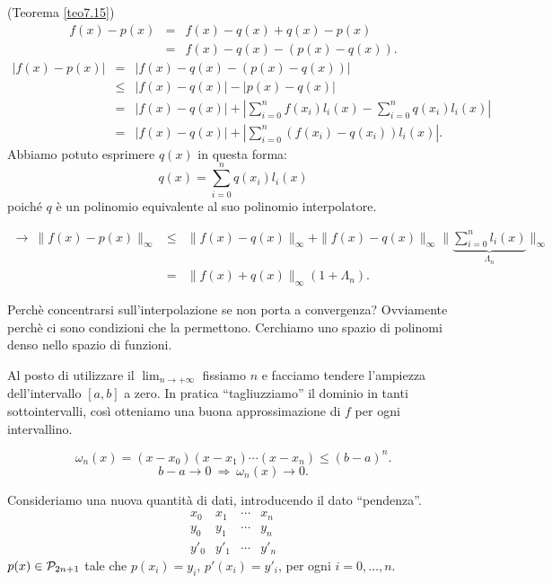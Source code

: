 \begin{dimo} (Teorema \ref{teo7.15})
\[
\begin{array}{lcl}
f(x) - p(x) & = & f(x) - q(x) + q(x) - p(x) \\
& = & f(x) - q(x) - (p(x) - q(x)).
\end{array}
\]
\[
\begin{array}{lcl}
|f(x) - p(x)| & = & |f(x) - q(x) -(p(x) - q(x))| \\
& \leq & |f(x) - q(x)| - |p(x) - q(x)| \\
& = & |f(x) - q(x)| + \left| \sum_{i = 0}^nf(x_i) l_i(x)
-\sum_{i=0}^nq(x_i)l_i(x)\right| \\
& = & | f(x) -q(x)| + \left| \sum_{i=0}^n (f(x_i)-q(x_i))l_i(x)\right|.
\end{array}
\]
Abbiamo potuto esprimere $q(x)$ in questa forma:
\[q(x) = \sum_{i=0}^nq(x_i)l_i(x)\]
poiché $q$ è un polinomio equivalente al suo polinomio
interpolatore.

\[
\begin{array}{lcl}
\longrightarrow \
\|f(x) - p(x)\|_{\infty} & \leq & \|f(x) - q(x)\|_\infty + \|f(x)- q(x)\|_{\infty}
\|\underbrace{\sum_{i=0}^n l_i(x)}_{\Lambda_n}\|_{\infty}\\
& = & \|f(x) + q(x)\|_\infty(1 + \Lambda_n).
\end{array}
\]
\end{dimo}


Perchè concentrarsi sull'interpolazione se non porta a convergenza? Ovviamente
perchè ci sono condizioni che la permettono. Cerchiamo uno spazio
di polinomi denso nello spazio di funzioni.

Al posto di utilizzare il $\lim_{n \to + \infty}$ fissiamo $n$ e facciamo tendere
l'ampiezza dell'intervallo $[a,b]$ a zero. In pratica ``tagliuzziamo'' il
dominio in tanti sottointervalli, così otteniamo una buona approssimazione
di $f$ per ogni intervallino.

\[\omega_n(x) = (x-x_0)(x-x_1)\cdots (x-x_n) \leq (b-a)^n.\]
\[b-a \longrightarrow 0 \ \Longrightarrow \ \omega_n(x) \longrightarrow 0.\]

Consideriamo una nuova quantità di dati, introducendo il dato ``pendenza''.
\[\begin{array}{ccccc}
x_0 & x_1 & \cdots & x_n   \\
y_0 & y_1 & \cdots & y_n  \\
y'_0 & y'_1 & \cdots & y'_n
\end{array}\]
$p(x) \in \mathcal{P}_{2n +1}$ tale che $p(x_i) = y_i,\, p'(x_i) = y'_i$, per ogni $i =
0, \ldots, n$.

